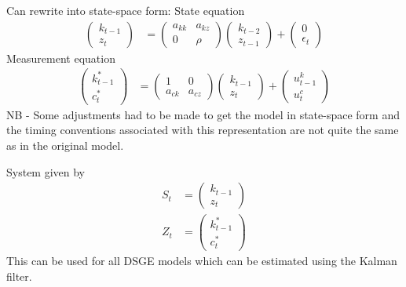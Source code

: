 \documentclass{beamer}
\begin{document}
\begin{frame}
 Can rewrite into state-space form:
 State equation   
\begin{align}
  \begin{pmatrix} k_{t-1} \\ z_t  \end{pmatrix} &= 
  \begin{pmatrix} a_{kk} & a_{kz} \\ 0 & \rho \end{pmatrix}
  \begin{pmatrix} k_{t-2} \\ z_{t-1} \end{pmatrix} +
  \begin{pmatrix} 0 \\ \epsilon_t \end{pmatrix}
\end{align}
\medskip
Measurement equation
\begin{align}
  \begin{pmatrix} k^*_{t-1} \\ c^*_t \end{pmatrix} &=
  \begin{pmatrix} 1 & 0 \\ a_{ck} & a_{cz}  \end{pmatrix}
  \begin{pmatrix} k_{t-1} \\ z_t \end{pmatrix} +
  \begin{pmatrix} u^k_{t-1} \\ u^c_t \end{pmatrix}
\end{align}
\medskip
 NB - Some adjustments had to be made to get the model in state-space form and the timing conventions associated with this representation are not quite the same as in the original model.
\end{frame}

\begin{frame}
  System given by
\begin{align}
  S_t &= \begin{pmatrix} k_{t-1} \\ z_t  \end{pmatrix}\\
  Z_t &= \begin{pmatrix} k^*_{t-1} \\ c^*_t \end{pmatrix}
\end{align}
 \medskip
 This can be used for all DSGE models which can be estimated using the Kalman filter. 
\end{frame}
\end{document}
